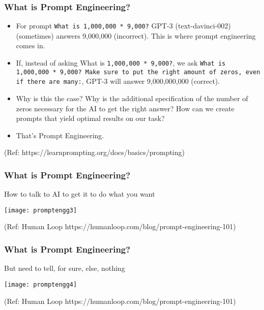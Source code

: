 

\begin{frame}[fragile]\frametitle{What is Prompt Engineering?}

\begin{itemize}
\item For prompt \lstinline|What is 1,000,000 * 9,000?| GPT-3 (text-davinci-002) (sometimes) answers 9,000,000 (incorrect). This is where prompt engineering comes in.
\item If, instead of asking What is \lstinline|1,000,000 * 9,000?|, we ask \lstinline|What is 1,000,000 * 9,000? Make sure to put the right amount of zeros, even if there are many:|, GPT-3 will answer 9,000,000,000 (correct). 
\item Why is this the case? Why is the additional specification of the number of zeros necessary for the AI to get the right answer? How can we create prompts that yield optimal results on our task? 			
\item That's Prompt Engineering.
\end{itemize}

{\tiny (Ref: https://learnprompting.org/docs/basics/prompting)}
\end{frame}



\begin{frame}[fragile]\frametitle{What is Prompt Engineering?}

How to talk to AI to get it to do what you want


\begin{center}
\texttt{[image: promptengg3]}

{\tiny (Ref: Human Loop https://humanloop.com/blog/prompt-engineering-101)}

\end{center}				
			
			

\end{frame}

\begin{frame}[fragile]\frametitle{What is Prompt Engineering?}

But need to tell, for sure, else, nothing


\begin{center}
\texttt{[image: promptengg4]}

{\tiny (Ref: Human Loop https://humanloop.com/blog/prompt-engineering-101)}

\end{center}				

\end{frame}


